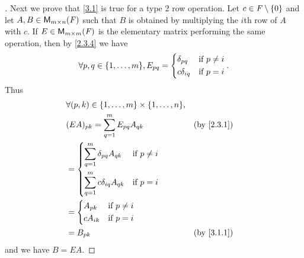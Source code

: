 \begin{proof}[]
	Next we prove that \cref{3.1} is true for a type 2 row operation.
	Let \(c \in \mathit{F} \setminus \left\lbrace0\right\rbrace\) and let \(A, B \in \mathsf{M}_{{m} \times n}({\mathit{F}})\) such that \(B\) is obtained by multiplying the \(i\)th row of \(A\) with \(c\).
	If \(E \in \mathsf{M}_{{m} \times m}({\mathit{F}})\) is the elementary matrix performing the same operation, then by \cref{2.3.4} we have
	\[
		\forall p, q \in \set{1, \dots, m}, E_{p q} = \begin{dcases}
			\delta_{p q}   & \text{if } p \neq i \\
			c \delta_{i q} & \text{if } p = i
		\end{dcases}.
	\]
	Thus
	\begin{align*}
		 & \forall (p, k) \in \set{1, \dots, m} \times \set{1, \dots, n},                 \\
		 & (EA)_{p k} = \sum_{q = 1}^m E_{p q} A_{q k}                    &  & \by{2.3.1} \\
		 & = \begin{dcases}
			     \sum_{q = 1}^m \delta_{p q} A_{q k}   & \text{if } p \neq i \\
			     \sum_{q = 1}^m c \delta_{i q} A_{q k} & \text{if } p = i
		     \end{dcases}                  \\
		 & = \begin{dcases}
			     A_{p k}   & \text{if } p \neq i \\
			     c A_{i k} & \text{if } p = i
		     \end{dcases}                                              \\
		 & = B_{p k}                                                      &  & \by{3.1.1}
	\end{align*}
	and we have \(B = EA\).


\end{proof}
